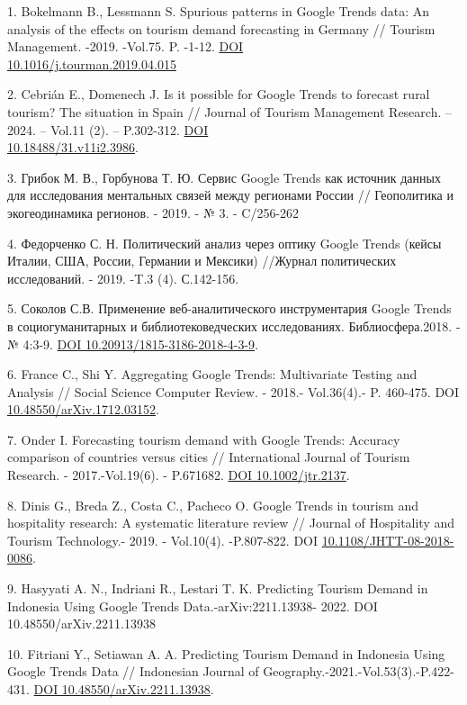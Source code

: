 \begin{references}
1. Bokelmann B., Lessmann S. Spurious patterns in Google Trends data: An
analysis of the effects on tourism demand forecasting in Germany //
Tourism Management. -2019. -Vol.75. P. -1-12.
\href{https://doi.org/10.1016/j.tourman.2019.04.015}{DOI\\
10.1016/j.tourman.2019.04.015}

2. Cebrián E., Domenech J. Is it possible for Google Trends to forecast
rural tourism? The situation in Spain // Journal of Tourism Management
Research. -- 2024. -- Vol.11 (2). -- P.302-312.
\href{https://doi.org/10.18488/31.v11i2.3986}{DOI\\
10.18488/31.v11i2.3986}.

3. Грибок М. В., Горбунова Т. Ю. Сервис Google Trends как источник данных
для исследования ментальных связей между регионами России // Геополитика
и экогеодинамика регионов. - 2019. - № 3. - C/256-262

4. Федорченко С. Н. Политический анализ через оптику Google Trends (кейсы
Италии, США, России, Германии и Мексики) //Журнал политических
исследований. - 2019. -T.3 (4). С.142-156.

5. Соколов С.В. Применение веб-аналитического инструментария Google
Trends в социогуманитарных и библиотековедческих исследованиях.
Библиосфера.2018. - № 4:3-9.
\href{https://doi.org/10.20913/1815-3186-2018-4-3-9}{DOI
10.20913/1815-3186-2018-4-3-9}.

6. France C., Shi Y. Aggregating Google Trends: Multivariate Testing and
Analysis // Social Science Computer Review. - 2018.- Vol.36(4).- P.
460-475. DOI
\href{http://dx.doi.org/10.48550/arXiv.1712.03152}{10.48550/arXiv.1712.03152}.

7. Onder I. Forecasting tourism demand with Google Trends: Accuracy
comparison of countries versus cities // International Journal of
Tourism Research. - 2017.-Vol.19(6). - P.671682.
\href{https://doi.org/10.1002/jtr.2137}{DOI 10.1002/jtr.2137}.

8. Dinis G., Breda Z., Costa C., Pacheco O. Google Trends in tourism and
hospitality research: A systematic literature review // Journal of
Hospitality and Tourism Technology.- 2019. - Vol.10(4). -P.807-822.
DOI
\href{http://dx.doi.org/10.1108/JHTT-08-2018-0086}{10.1108/JHTT-08-2018-0086}.

9. Hasyyati A. N., Indriani R., Lestari T. K. Predicting Tourism Demand
in Indonesia Using Google Trends Data.-arXiv:2211.13938- 2022. DOI
10.48550/arXiv.2211.13938

10. Fitriani Y., Setiawan A. A. Predicting Tourism Demand in Indonesia
Using Google Trends Data // Indonesian Journal of
Geography.-2021.-Vol.53(3).-P.422-431.
\href{https://doi.org/10.48550/arXiv.2211.13938}{DOI
10.48550/arXiv.2211.13938}.
\end{references}

